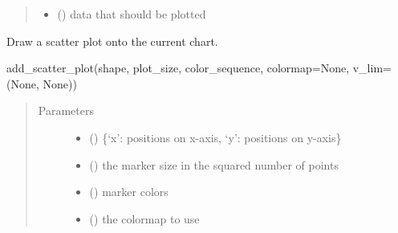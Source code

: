 \documentclass[letterpaper,10pt,english,openany,oneside]{sphinxmanual}
\begin{document}
\begin{fulllineitems}
\begin{fulllineitems}
\begin{quote}
\begin{description}
\begin{itemize}
\item {} 
 () \textendash{} data that should be plotted

\end{itemize}

\end{description}\end{quote}

\end{fulllineitems}


\begin{fulllineitems}
\label{\detokenize{pygpc:pygpc.vis.Visualization.add_scatter_plot}}
Draw a scatter plot onto the current chart.

add\_scatter\_plot(shape, plot\_size, color\_sequence, colormap=None, v\_lim=(None, None))
\begin{quote}\begin{description}
\item[{Parameters}] \leavevmode\begin{itemize}
\item {} 
 () \textendash{} \{‘x’: positions on x-axis, ‘y’: positions on y-axis\}

\item {} 
 () \textendash{} the marker size in the squared number of points

\item {} 
 () \textendash{} marker colors

\item {} 
 (\sphinxstyleliteralemphasis{\sphinxupquote{, }}\sphinxstyleliteralemphasis{\sphinxupquote{, }}) \textendash{} the colormap to use


\end{itemize}
\end{description}
\end{quote}
\end{fulllineitems}
\end{fulllineitems}
\end{document}
